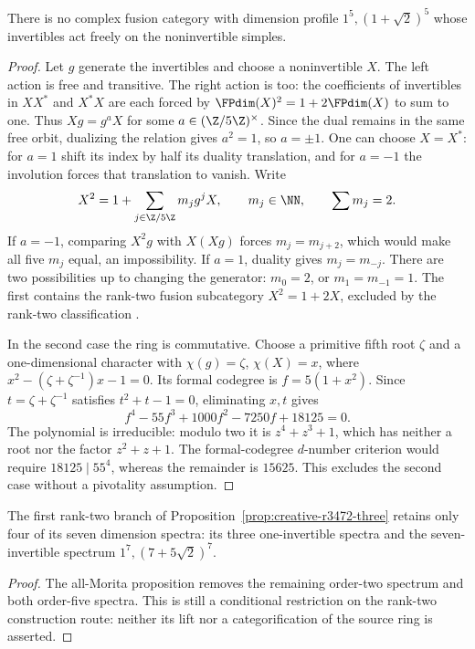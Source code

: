 \begin{lemma}
\label{lem:focus-c5-silver}
There is no complex fusion category with dimension profile
$1^5,(1+\sqrt2)^5$ whose invertibles act freely on the
noninvertible simples.
\end{lemma}
\begin{proof}
Let $g$ generate the invertibles and choose a noninvertible $X$.
The left action is free and transitive. The right action is too:
the coefficients of invertibles in $XX^*$ and $X^*X$ are each
forced by $\FPdim(X)^2=1+2\FPdim(X)$ to sum to one. Thus
$Xg=g^aX$ for some $a\in(\Z/5\Z)^\times$.
Since the dual remains in the same free orbit, dualizing the
relation gives $a^2=1$, so $a=\pm1$.
One can choose $X=X^*$: for $a=1$ shift its index by half its
duality translation, and for $a=-1$ the involution forces that
translation to vanish. Write
\[
 X^2=1+\sum_{j\in\Z/5\Z}m_jg^jX,
 \qquad m_j\in\NN,\qquad\sum m_j=2.
\]
If $a=-1$, comparing $X^2g$ with $X(Xg)$ forces $m_j=m_{j+2}$,
which would make all five $m_j$ equal, an impossibility.
If $a=1$, duality gives $m_j=m_{-j}$. There are two possibilities
up to changing the generator: $m_0=2$, or $m_1=m_{-1}=1$.
The first contains the rank-two fusion subcategory
$X^2=1+2X$, excluded by the rank-two classification
\cite{Ostrik2}.

In the second case the ring is commutative. Choose a primitive fifth
root $\zeta$ and a one-dimensional character with
$\chi(g)=\zeta$, $\chi(X)=x$, where
$x^2-(\zeta+\zeta^{-1})x-1=0$. Its formal codegree is
$f=5(1+x^2)$. Since $t=\zeta+\zeta^{-1}$ satisfies
$t^2+t-1=0$, eliminating $x,t$ gives
\[
 f^4-55f^3+1000f^2-7250f+18125=0.
\]
The polynomial is irreducible: modulo two it is $z^4+z^3+1$,
which has neither a root nor the factor $z^2+z+1$.
The formal-codegree $d$-number criterion
\cite[Theorem~1.2 and Lemma~2.7]{OstrikCode} would
require $18125\mid55^4$, whereas the remainder is $15625$.
This excludes the second case without a pivotality assumption.
\end{proof}

\begin{corollary}
The first rank-two branch of
Proposition~\ref{prop:creative-r3472-three} retains only four of its
seven dimension spectra: its three one-invertible spectra and the
seven-invertible spectrum $1^7,(7+5\sqrt2)^7$.
\end{corollary}
\begin{proof}
The all-Morita proposition removes the remaining order-two spectrum
and both order-five spectra. This is still a conditional restriction
on the rank-two construction route: neither its lift nor a
categorification of the source ring is asserted.
\end{proof}

